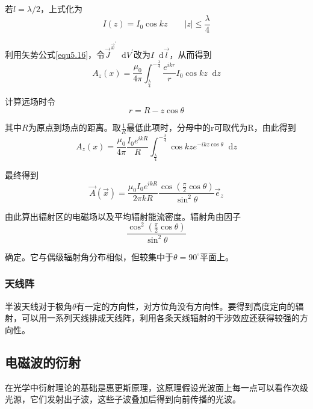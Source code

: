 \documentclass[UTF8]{ctexart}
\newcommand*{\dif}{\mathop{}\!\mathrm{d}}
\begin{document}
\noindent 若$l = \lambda /2$，上式化为
\begin{equation}
    I(z) = I_0 \cos k z \qquad |z| \le \frac{\lambda}{4}
\end{equation}

    利用矢势公式\autoref{equ5.16}，令$\vec{J}^{\vec{x}^{\prime}} \dif V^{\prime}$改为$I \dif \vec{l}$，从而得到 
    \begin{equation}
        A_z(x) = \frac{\mu_0}{4 \pi} \int_{\frac{\lambda}{4}}^{-\frac{\lambda}{4}} \frac{e^{ikr}}{r} I_0 \cos k z \dif z
    \end{equation}

\noindent 计算远场时令
\begin{equation}
    r = R - z \cos \theta 
\end{equation}

\noindent 其中$R$为原点到场点的距离。取$\frac{1}{R}$最低此项时，分母中的r可取代为R，由此得到
\begin{equation}
    A_z(x) = \frac{\mu_0}{4 \pi} \frac{I_0 e^{ikR}}{R} \int_{\frac{\lambda}{4}}^{-\frac{\lambda}{4}} \cos k z e^{-ikz \cos \theta} \dif z
\end{equation}

\noindent 最终得到
\begin{equation}
    \vec{A}(\vec{x})=\frac{\mu_{0} I_{0} e^{i k R}}{2 \pi k R} \frac{\cos \left(\frac{\pi}{2} \cos \theta\right)}{\sin ^{2} \theta} \vec{e}_{z}
\end{equation}

    由此算出辐射区的电磁场以及平均辐射能流密度。辐射角由因子
    \begin{equation}
        \frac{\cos^2 \left(\frac{\pi}{2} \cos \theta\right)}{\sin^2 \theta}
    \end{equation}

\noindent 确定。它与偶级辐射角分布相似，但较集中于$\theta = 90^{\circ}$平面上。

    \subsubsection{天线阵}
    半波天线对于极角$\theta$有一定的方向性，对方位角没有方向性。要得到高度定向的辐射，可以用一系列天线排成天线阵，利用各条天线辐射的干涉效应还获得较强的方向性。

    \subsection{电磁波的衍射}
    在光学中衍射理论的基础是惠更斯原理，这原理假设光波面上每一点可以看作次级光源，它们发射出子波，这些子波叠加后得到向前传播的光波。
\end{document}
